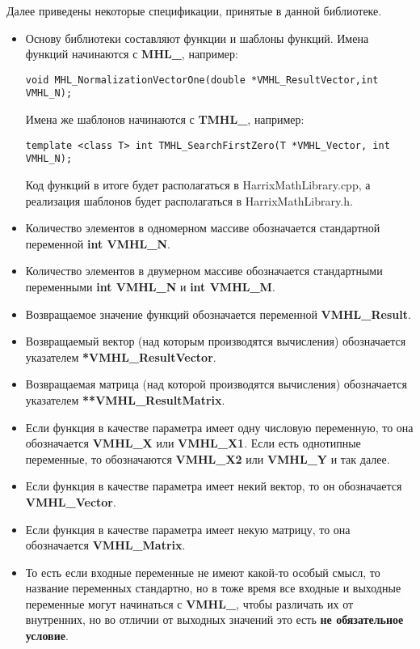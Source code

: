 Далее приведены некоторые спецификации, принятые в данной библиотеке.
\begin{itemize}
\item Основу библиотеки составляют функции и шаблоны функций. Имена функций начинаются с \textbf{MHL\_}, например:
\begin{lstlisting}[label=examplename,caption=Пример названия функции]
void MHL_NormalizationVectorOne(double *VMHL_ResultVector,int VMHL_N);
\end{lstlisting}
Имена же шаблонов начинаются с \textbf{TMHL\_}, например:
\begin{lstlisting}[label=examplename2,caption=Пример названия шаблона функции]
template <class T> int TMHL_SearchFirstZero(T *VMHL_Vector, int VMHL_N);
\end{lstlisting}
Код функций в итоге будет располагаться в HarrixMathLibrary.cpp, а реализация шаблонов будет располагаться в HarrixMathLibrary.h.
\item  Количество элементов в одномерном массиве обозначается стандартной переменной  \textbf{int VMHL\_N}.
\item Количество элементов в двумерном массиве обозначается стандартными переменными  \textbf{int VMHL\_N} и \textbf{int VMHL\_M}.
\item Возвращаемое значение функций обозначается переменной \textbf{VMHL\_Result}.
\item Возвращаемый вектор (над которым производятся вычисления) обозначается указателем \textbf{*VMHL\_ResultVector}.
\item Возвращаемая матрица (над которой производятся вычисления) обозначается указателем \textbf{**VMHL\_ResultMatrix}.
\item Если функция в качестве параметра имеет одну числовую переменную, то она обозначается \textbf{VMHL\_X} или \textbf{VMHL\_X1}. Если есть однотипные переменные, то обозначаются \textbf{VMHL\_X2} или \textbf{VMHL\_Y} и так далее.
\item Если функция в качестве параметра имеет некий вектор, то он обозначается \textbf{VMHL\_Vector}.
\item Если функция в качестве параметра имеет некую матрицу, то она обозначается \textbf{VMHL\_Matrix}.
\item То есть если входные переменные не имеют какой-то особый смысл, то название переменных стандартно, но в тоже время все входные и выходные переменные могут начинаться с \textbf{VMHL\_}, чтобы различать их от внутренних, но во отличии от выходных значений это есть \textbf{не обязательное условие}.
\end{itemize}

